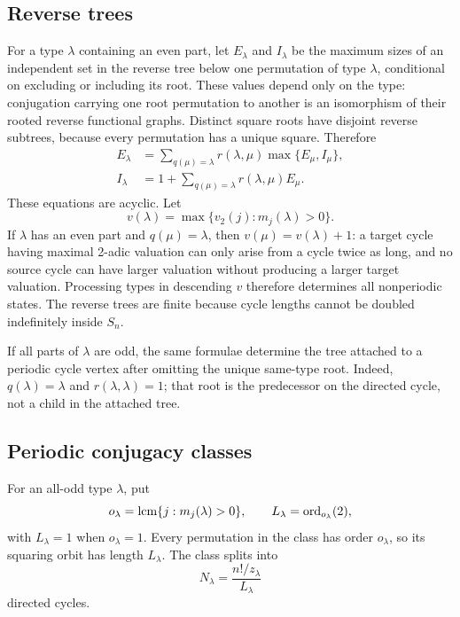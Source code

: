 \subsection{Reverse trees}

For a type \(\lambda\) containing an even part, let \(E_\lambda\) and
\(I_\lambda\) be the maximum sizes of an independent set in the reverse tree
below one permutation of type \(\lambda\), conditional on excluding or
including its root.  These values depend only on the type: conjugation carrying
one root permutation to another is an isomorphism of their rooted reverse
functional graphs.  Distinct square roots have disjoint reverse subtrees,
because every permutation has a unique square.  Therefore
\begin{align}
 E_\lambda&=\sum_{q(\mu)=\lambda}
 r(\lambda,\mu)\max\{E_\mu,I_\mu\},
 \label{eq:a007234-E}\\
 I_\lambda&=1+\sum_{q(\mu)=\lambda}
 r(\lambda,\mu)E_\mu.
 \label{eq:a007234-I}
\end{align}
These equations are acyclic.  Let
\[
 v(\lambda)=\max\{v_2(j):m_j(\lambda)>0\}.
\]
If \(\lambda\) has an even part and \(q(\mu)=\lambda\), then
\(v(\mu)=v(\lambda)+1\): a target cycle having maximal 2-adic valuation can
only arise from a cycle twice as long, and no source cycle can have larger
valuation without producing a larger target valuation.  Processing types in
descending \(v\) therefore determines all nonperiodic states.  The reverse
trees are finite because cycle lengths cannot be doubled indefinitely inside
\(S_n\).

If all parts of \(\lambda\) are odd, the same formulae determine the tree
attached to a periodic cycle vertex after omitting the unique same-type root.
Indeed, \(q(\lambda)=\lambda\) and
\(r(\lambda,\lambda)=1\); that root is the predecessor on the directed cycle,
not a child in the attached tree.

\subsection{Periodic conjugacy classes}

For an all-odd type \(\lambda\), put
\begin{equation}
 o_\lambda=\operatorname{lcm}\{j:m_j(\lambda)>0\},
 \qquad
 L_\lambda=\operatorname{ord}_{o_\lambda}(2),
 \label{eq:a007234-period}
\end{equation}
with \(L_\lambda=1\) when \(o_\lambda=1\).  Every permutation in the class has
order \(o_\lambda\), so its squaring orbit has length \(L_\lambda\).  The
class splits into
\begin{equation}
 N_\lambda=\frac{n!/z_\lambda}{L_\lambda}
 \label{eq:a007234-numbercycles}
\end{equation}
directed cycles.

